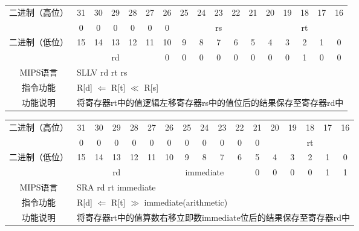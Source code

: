 \begin{table}
\begin{tabular}{|c|c|c|c|c|c|c|c|c|c|c|c|c|c|c|c|c|}
\hline
\multirow{2}{*}{二进制（高位）} &
31&30&29&28&27&26&25&24&23&22&21&20&19&18&17&16\\
\cline{2-17}
&
0&0&0&0&0&
0&
\multicolumn{5}{c|}{rs}&
\multicolumn{5}{c|}{rt}\\
\hline
\multirow{2}{*}{二进制（低位）} &
15&14&13&12&11&10&9&8&7&6&5&4&3&2&1&0\\
\cline{2-17}
&
\multicolumn{5}{c|}{rd} &
0&0&0&0&0&
0&0&0&1&0&
0\\
\hline
MIPS语言&
\multicolumn{16}{l|}{SLLV rd rt rs}\\
\hline
指令功能&
\multicolumn{16}{l|}{R[d] $\Leftarrow$ R[t] $\ll$ R[s]}\\
\hline
功能说明&
\multicolumn{16}{l|}{将寄存器rt中的值逻辑左移寄存器rs中的值位后的结果保存至寄存器rd中}\\
\hline
\end{tabular}
\end{table}

\begin{table}
\begin{tabular}{|c|c|c|c|c|c|c|c|c|c|c|c|c|c|c|c|c|}
\hline
\multirow{2}{*}{二进制（高位）} &
31&30&29&28&27&26&25&24&23&22&21&20&19&18&17&16\\
\cline{2-17}
&
0&0&0&0&0&
0&0&0&0&0&
0&
\multicolumn{5}{c|}{rt}\\
\hline
\multirow{2}{*}{二进制（低位）} &
15&14&13&12&11&10&9&8&7&6&5&4&3&2&1&0\\
\cline{2-17}
&
\multicolumn{5}{c|}{rd} &
\multicolumn{5}{c|}{immediate} &
0&0&0&0&1&
1\\
\hline
MIPS语言&
\multicolumn{16}{l|}{SRA rd rt immediate}\\
\hline
指令功能&
\multicolumn{16}{l|}{R[d] $\Leftarrow$ R[t] $\gg$ immediate(arithmetic)}\\
\hline
功能说明&
\multicolumn{16}{l|}{将寄存器rt中的值算数右移立即数immediate位后的结果保存至寄存器rd中}\\
\hline
\end{tabular}
\end{table}

